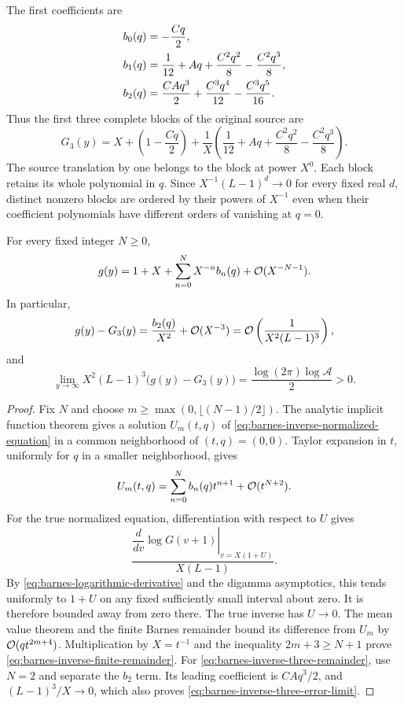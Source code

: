 The first coefficients are
\begin{align}
 b_0(q)&=-\frac{Cq}{2},\notag\\
 b_1(q)&=\frac1{12}+Aq+\frac{C^2q^2}{8}-\frac{C^2q^3}{8},\notag\\
 b_2(q)&=\frac{CAq^3}{2}+\frac{C^3q^4}{12}-\frac{C^3q^5}{16}.
 \label{eq:barnes-inverse-first-coefficients}
\end{align}
Thus the first three complete blocks of the original source are
\begin{equation}
 G_3(y)=X+\left(1-\frac{Cq}{2}\right)
       +\frac1X\left(\frac1{12}+Aq
                    +\frac{C^2q^2}{8}-\frac{C^2q^3}{8}\right).
 \label{eq:barnes-inverse-three-blocks}
\end{equation}
The source translation by one belongs to the block at power $X^0$.
Each block retains its whole polynomial in $q$. Since
$X^{-1}(L-1)^d\to0$ for every fixed real $d$, distinct nonzero
blocks are ordered by their powers of $X^{-1}$ even when their
coefficient polynomials have different orders of vanishing at $q=0$.

\begin{theorem}
\label{thm:barnes-inverse-finite-order}
For every fixed integer $N\ge0$,
\begin{equation}
 g(y)=1+X+\sum_{n=0}^{N}X^{-n}b_n(q)+\mathcal O(X^{-N-1}).
 \label{eq:barnes-inverse-finite-remainder}
\end{equation}
In particular,
\begin{equation}
 g(y)-G_3(y)=\frac{b_2(q)}{X^2}+\mathcal O(X^{-3})
            =\mathcal O\left(\frac1{X^2(L-1)^3}\right),
 \label{eq:barnes-inverse-three-remainder}
\end{equation}
and
\begin{equation}
 \lim_{y\to\infty}X^2(L-1)^3\bigl(g(y)-G_3(y)\bigr)
   =\frac{\log(2\pi)\log\mathcal A}{2}>0.
 \label{eq:barnes-inverse-three-error-limit}
\end{equation}
\end{theorem}
\begin{proof}
Fix $N$ and choose
$m\ge\max(0,\lfloor(N-1)/2\rfloor)$. The analytic implicit function
theorem gives a solution $U_m(t,q)$ of \eqref{eq:barnes-inverse-normalized-equation}
in a common neighborhood of $(t,q)=(0,0)$. Taylor expansion in $t$,
uniformly for $q$ in a smaller neighborhood, gives
\[
 U_m(t,q)=\sum_{n=0}^{N}b_n(q)t^{n+1}+\mathcal O(t^{N+2}).
\]
For the true normalized equation, differentiation with respect to $U$
gives
\[
 \frac{\left.\dfrac{d}{dv}\log G(v+1)\right|_{v=X(1+U)}}{X(L-1)}.
\]
By \eqref{eq:barnes-logarithmic-derivative} and the digamma asymptotics,
this tends uniformly to $1+U$ on any fixed sufficiently small interval
about zero. It is therefore bounded away from zero there.
The true inverse has $U\to0$. The mean value theorem and the finite
Barnes remainder bound its difference from $U_m$ by
$\mathcal O(qt^{2m+4})$. Multiplication by $X=t^{-1}$ and the inequality
$2m+3\ge N+1$ prove \eqref{eq:barnes-inverse-finite-remainder}.
For \eqref{eq:barnes-inverse-three-remainder}, use $N=2$ and separate
the $b_2$ term. Its leading coefficient is $CAq^3/2$, and
$(L-1)^3/X\to0$, which also proves
\eqref{eq:barnes-inverse-three-error-limit}.
\end{proof}

